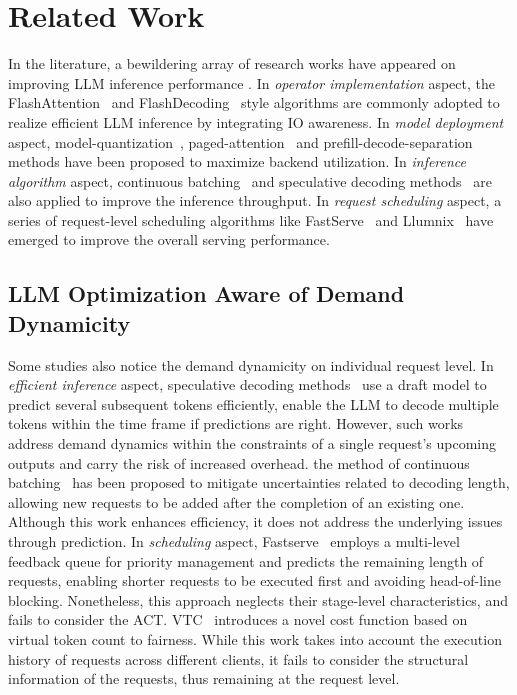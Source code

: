 \section{Related Work}
\label{sec:related}

In the literature, a bewildering array of research works have appeared on improving LLM inference performance .
In \emph{operator implementation} aspect, the FlashAttention~\cite{dao2022flashattention} and FlashDecoding~\cite{hong2024flashdecoding} style algorithms are commonly adopted to realize efficient LLM inference by integrating IO awareness. 
In \emph{model deployment} aspect, model-quantization~\cite{frantar2022gptq,kim2023squeezellm}, paged-attention~\cite{kwon2023efficient} and prefill-decode-separation~\cite{zhong_distserve_2024,agrawal_taming_2024} methods have been proposed to maximize backend utilization.
In \emph{inference algorithm} aspect, continuous batching~\cite{yu_orca_2022} and speculative decoding methods~\cite{miao2023specinfer,cai2024medusa} are also applied to improve the inference throughput.
In \emph{request scheduling} aspect, a series of request-level scheduling algorithms like FastServe~\cite{wu2023fast} and Llumnix~\cite{sun2024llumnix} have emerged to improve the overall serving performance. 

\subsection{LLM Optimization Aware of Demand Dynamicity}
Some studies also notice the demand dynamicity on individual request level.  
In \emph{efficient inference} aspect, speculative decoding methods~\cite{miao2023specinfer,cai2024medusa} use a draft model to predict several subsequent tokens efficiently, enable the LLM to decode multiple tokens within the time frame if predictions are right. However, such works address demand dynamics within the constraints of a single request's upcoming outputs and carry the risk of increased overhead. the method of continuous batching~\cite{yu_orca_2022} has been proposed to mitigate uncertainties related to decoding length, allowing new requests to be added after the completion of an existing one. Although this work enhances efficiency, it does not address the underlying issues through prediction. 
In \emph{scheduling} aspect, Fastserve~\cite{wu2023fast} employs a multi-level feedback queue for priority management and predicts the remaining length of requests, enabling shorter requests to be executed first and avoiding head-of-line blocking. Nonetheless, this approach neglects their stage-level characteristics, and fails to consider the ACT. VTC~\cite{sheng2024fairness} introduces a novel cost function based on virtual token count to fairness. While this work takes into account the execution history of requests across different clients, it fails to consider the structural information of the requests, thus remaining at the request level.

